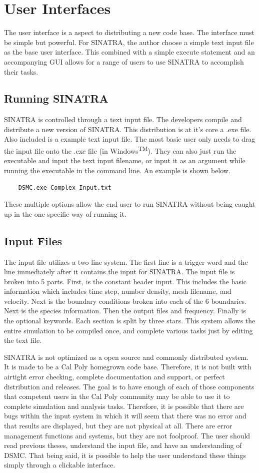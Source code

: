 \section{User Interfaces}
The user interface is a aspect to distributing a new code base. The interface must be simple but powerful. For SINATRA, the author choose a simple text input file as the base user interface. This combined with a simple execute statement and an accompanying GUI allows for a range of users to use SINATRA to accomplish their tasks. 
\subsection{Running SINATRA}
SINATRA is controlled through a text input file. The developers compile and distribute a new version of SINATRA. This distribution is at it's core a .exe file. Also included is a example text input file. The most basic user only needs to drag the input file onto the .exe file (in Windows\textsuperscript{TM}). They can also just run the executable and input the text input filename, or input it as an argument while running the executable in the command line. An example is shown below.
\begin{verbatim}
    DSMC.exe Complex_Input.txt
\end{verbatim}
These multiple options allow the end user to run SINATRA without being caught up in the one specific way of running it. 

\subsection{Input Files}
The input file utilizes a two line system. The first line is a trigger word and the line immediately after it contains the input for SINATRA. The input file is broken into 5 parts. First, is the constant header input. This includes the basic information which includes time step, number density, mesh filename, and velocity. Next is the boundary conditions broken into each of the 6 boundaries. Next is the species information. Then the output files and frequency. Finally is the optional keywords. Each section is split by three stars. This system allows the entire simulation to be compiled once, and complete various tasks just by editing the text file. \par
SINATRA is not optimized as a open source and commonly distributed system. It is made to be a Cal Poly homegrown code base. Therefore, it is not built with airtight error checking, complete documentation and support, or perfect distribution and releases. The goal is to have enough of each of those components that competent users in the Cal Poly community may be able to use it to complete simulation and analysis tasks. Therefore, it is possible that there are bugs within the input system in which it will seem that there was no error and that results are displayed, but they are not physical at all. There are error management functions and systems, but they are not foolproof. The user should read previous theses, understand the input file, and have an understanding of DSMC. That being said, it is possible to help the user understand these things simply through a clickable interface. 
